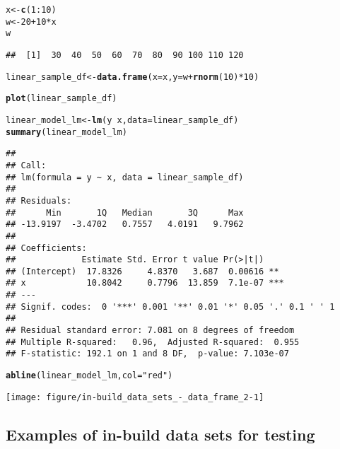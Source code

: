 \documentclass[a4paper,10pt]{book}\usepackage[]{graphicx}\usepackage[]{color}
\makeatletter
\def\maxwidth{ %
  \ifdim\Gin@nat@width>\linewidth
    \linewidth
  \else
    \Gin@nat@width
  \fi
}
\newcommand{\hlnum}[1]{\textcolor[rgb]{0.686,0.059,0.569}{#1}}%
\newcommand{\hlstr}[1]{\textcolor[rgb]{0.192,0.494,0.8}{#1}}%
\newcommand{\hlopt}[1]{\textcolor[rgb]{0,0,0}{#1}}%
\newcommand{\hlstd}[1]{\textcolor[rgb]{0.345,0.345,0.345}{#1}}%
\newcommand{\hlkwb}[1]{\textcolor[rgb]{0.69,0.353,0.396}{#1}}%
\newcommand{\hlkwc}[1]{\textcolor[rgb]{0.333,0.667,0.333}{#1}}%
\newcommand{\hlkwd}[1]{\textcolor[rgb]{0.737,0.353,0.396}{\textbf{#1}}}%
\newenvironment{kframe}{%
 \def\at@end@of@kframe{}%
 \ifinner\ifhmode%
  \def\at@end@of@kframe{\end{minipage}}%
  \begin{minipage}{\columnwidth}%
 \fi\fi%
 \def\FrameCommand##1{\hskip\@totalleftmargin \hskip-\fboxsep
 \colorbox{shadecolor}{##1}\hskip-\fboxsep
     \hskip-\linewidth \hskip-\@totalleftmargin \hskip\columnwidth}%
 \MakeFramed {\advance\hsize-\width
   \@totalleftmargin\z@ \linewidth\hsize
   \@setminipage}}%
 {\par\unskip\endMakeFramed%
 \at@end@of@kframe}
\newenvironment{knitrout}{}{} %
\makeatother
\begin{document}
\begin{knitrout}
\color{fgcolor}\begin{kframe}
\begin{alltt}
\hlstd{x} \hlkwb{<-} \hlkwd{c}\hlstd{(}\hlnum{1}\hlopt{:}\hlnum{10}\hlstd{)}
\hlstd{w} \hlkwb{<-} \hlnum{20} \hlopt{+} \hlnum{10}\hlopt{*}\hlstd{x}
\hlstd{w}
\end{alltt}
\begin{verbatim}
##  [1]  30  40  50  60  70  80  90 100 110 120
\end{verbatim}
\begin{alltt}
\hlstd{linear_sample_df} \hlkwb{<-} \hlkwd{data.frame}\hlstd{(}\hlkwc{x}\hlstd{=x,} \hlkwc{y}\hlstd{=w} \hlopt{+} \hlkwd{rnorm}\hlstd{(}\hlnum{10}\hlstd{)}\hlopt{*}\hlnum{10}\hlstd{)}

\hlkwd{plot}\hlstd{(linear_sample_df)}

\hlstd{linear_model_lm} \hlkwb{<-} \hlkwd{lm}\hlstd{(y} \hlopt{~} \hlstd{x,} \hlkwc{data}\hlstd{=linear_sample_df)}
\hlkwd{summary}\hlstd{(linear_model_lm)}
\end{alltt}
\begin{verbatim}
## 
## Call:
## lm(formula = y ~ x, data = linear_sample_df)
## 
## Residuals:
##      Min       1Q   Median       3Q      Max 
## -13.9197  -3.4702   0.7557   4.0191   9.7962 
## 
## Coefficients:
##             Estimate Std. Error t value Pr(>|t|)    
## (Intercept)  17.8326     4.8370   3.687  0.00616 ** 
## x            10.8042     0.7796  13.859  7.1e-07 ***
## ---
## Signif. codes:  0 '***' 0.001 '**' 0.01 '*' 0.05 '.' 0.1 ' ' 1
## 
## Residual standard error: 7.081 on 8 degrees of freedom
## Multiple R-squared:   0.96,	Adjusted R-squared:  0.955 
## F-statistic: 192.1 on 1 and 8 DF,  p-value: 7.103e-07
\end{verbatim}
\begin{alltt}
\hlkwd{abline}\hlstd{(linear_model_lm,} \hlkwc{col}\hlstd{=}\hlstr{"red"}\hlstd{)}
\end{alltt}
\end{kframe}
\texttt{[image: figure/in-build\_data\_sets\_-\_data\_frame\_2-1]} 

\end{knitrout}


\subsection{Examples of in-build data sets for testing}
\end{document}
